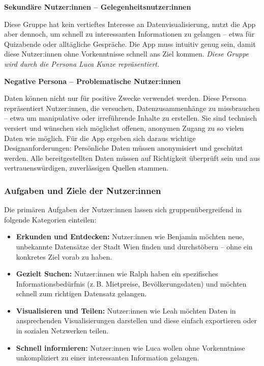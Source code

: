 \medskip
\noindent\textbf{Sekundäre Nutzer:innen -- Gelegenheitsnutzer:innen}

\smallskip
\noindent
Diese Gruppe hat kein vertieftes Interesse an Datenvisualisierung, nutzt die App aber dennoch,
um schnell zu interessanten Informationen zu gelangen -- etwa für Quizabende oder alltägliche Gespräche.
Die App muss intuitiv genug sein, damit diese Nutzer:innen ohne Vorkenntnisse schnell ans Ziel kommen.
\textit{Diese Gruppe wird durch die Persona Luca Kunze repräsentiert.}

\medskip
\noindent\textbf{Negative Persona -- Problematische Nutzer:innen}

\smallskip
\noindent
Daten können nicht nur für positive Zwecke verwendet werden.
Diese Persona repräsentiert Nutzer:innen, die versuchen, Datenzusammenhänge zu missbrauchen -- etwa um manipulative oder irreführende Inhalte zu erstellen.
Sie sind technisch versiert und wünschen sich möglichst offenen, anonymen Zugang zu so vielen Daten wie möglich.
Für die App ergeben sich daraus wichtige Designanforderungen: Persönliche Daten müssen anonymisiert und geschützt werden.
Alle bereitgestellten Daten müssen auf Richtigkeit überprüft sein und aus vertrauenswürdigen, zuverlässigen Quellen stammen.

\subsubsection{Aufgaben und Ziele der Nutzer:innen}

\smallskip
\noindent
Die primären Aufgaben der Nutzer:innen lassen sich gruppenübergreifend in folgende Kategorien einteilen:

\begin{itemize}
    \item \textbf{Erkunden und Entdecken:} Nutzer:innen wie Benjamin möchten neue, unbekannte Datensätze der Stadt Wien finden und durchstöbern -- ohne ein konkretes Ziel vorab zu haben.
    \item \textbf{Gezielt Suchen:} Nutzer:innen wie Ralph haben ein spezifisches Informationsbedürfnis (z.\,B. Mietpreise, Bevölkerungsdaten) und möchten schnell zum richtigen Datensatz gelangen.
    \item \textbf{Visualisieren und Teilen:} Nutzer:innen wie Leah möchten Daten in ansprechenden Visualisierungen darstellen und diese einfach exportieren oder in sozialen Netzwerken teilen.
    \item \textbf{Schnell informieren:} Nutzer:innen wie Luca wollen ohne Vorkenntnisse unkompliziert zu einer interessanten Information gelangen.
\end{itemize}

